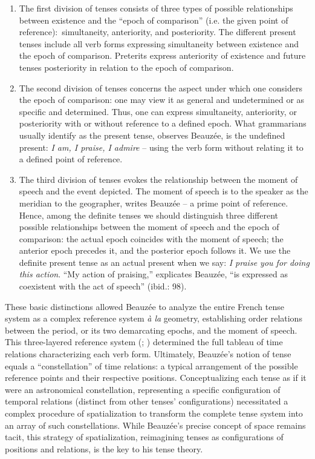 \documentclass[output=paper]{langsci/langscibook}
\begin{document}
 \begin{enumerate}
 \item The first division of tenses consists of three types of possible relationships between existence and the “epoch of comparison” (i.e. the given point of reference):~simultaneity, anteriority, and posteriority. The different present tenses include all verb forms expressing simultaneity between existence and the epoch of comparison. Preterits express anteriority of existence and future tenses posteriority in relation to the epoch of comparison.
 
 \item The second division of tenses concerns the aspect under which one considers the epoch of comparison: one may view it as general and undetermined or as specific and determined. Thus, one can express simultaneity, anteriority, or posteriority with or without reference to a defined epoch. What grammarians usually identify as the present tense, observes Beauzée, is the undefined present: \textit{I am, I praise, I admire} -- using the verb form without relating it to a defined point of reference.
 
 \item The third division of tenses evokes the relationship between the moment of speech and the event depicted. The moment of speech is to the speaker as the meridian to the geographer, writes Beauzée -- a prime point of reference. Hence, among the definite tenses we should distinguish three different possible relationships between the moment of speech and the epoch of comparison: the actual epoch coincides with the moment of speech; the anterior epoch precedes it, and the posterior epoch follows it. We use the definite present tense as an actual present when we say: \textit{I praise you for doing this action}. “My action of praising,” explicates Beauzée, “is expressed as coexistent with the act of speech” (ibid.: 98).
\end{enumerate}
 
These basic distinctions allowed Beauzée to analyze the entire French tense system as a complex reference system \textit{à la} geometry, establishing order relations between the period, or its two demarcating epochs, and the moment of speech. This three-layered reference system (\citealt{auroux_innovation_1991}; \citealt{fournier_histoire_2013}) determined the full tableau of time relations characterizing each verb form. Ultimately, Beauzée’s notion of tense equals a “constellation” of time relations: a typical arrangement of the possible reference points and their respective positions. Conceptualizing each tense as if it were an astronomical constellation, representing a specific configuration of temporal relations (distinct from other tenses’ configurations) necessitated a complex procedure of spatialization to transform the complete tense system into an array of such constellations. While Beauzée’s precise concept of space remains tacit, this strategy of spatialization, reimagining tenses as configurations of positions and relations, is the key to his tense theory.
\end{document}
